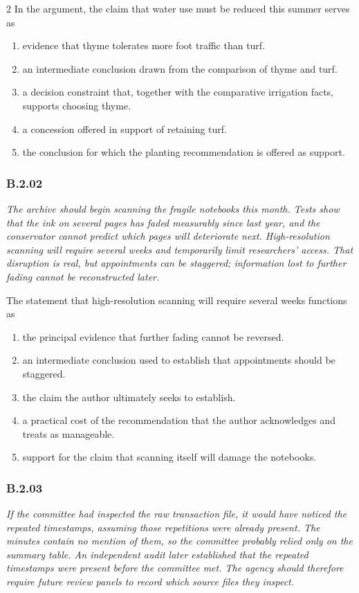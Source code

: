 \documentclass[10pt]{extarticle}
\newcommand{\choice}[1]{\item #1}
\newcommand{\bankitem}[1]{\subsubsection*{#1}}
\begin{document}
\begin{multicols}{2}
In the argument, the claim that water use must be reduced this summer serves as
\begin{enumerate}[label=(\alph*)]
  \choice{evidence that thyme tolerates more foot traffic than turf.}
  \choice{an intermediate conclusion drawn from the comparison of thyme and turf.}
  \choice{a decision constraint that, together with the comparative irrigation facts, supports choosing thyme.}
  \choice{a concession offered in support of retaining turf.}
  \choice{the conclusion for which the planting recommendation is offered as support.}
\end{enumerate}
\bankitem{B.2.02}
\emph{The archive should begin scanning the fragile notebooks this month. Tests show that the ink on several pages has faded measurably since last year, and the conservator cannot predict which pages will deteriorate next. High-resolution scanning will require several weeks and temporarily limit researchers' access. That disruption is real, but appointments can be staggered; information lost to further fading cannot be reconstructed later.}

The statement that high-resolution scanning will require several weeks functions as
\begin{enumerate}[label=(\alph*)]
  \choice{the principal evidence that further fading cannot be reversed.}
  \choice{an intermediate conclusion used to establish that appointments should be staggered.}
  \choice{the claim the author ultimately seeks to establish.}
  \choice{a practical cost of the recommendation that the author acknowledges and treats as manageable.}
  \choice{support for the claim that scanning itself will damage the notebooks.}
\end{enumerate}
\bankitem{B.2.03}
\emph{If the committee had inspected the raw transaction file, it would have noticed the repeated timestamps, assuming those repetitions were already present. The minutes contain no mention of them, so the committee probably relied only on the summary table. An independent audit later established that the repeated timestamps were present before the committee met. The agency should therefore require future review panels to record which source files they inspect.}


\end{multicols}
\end{document}
